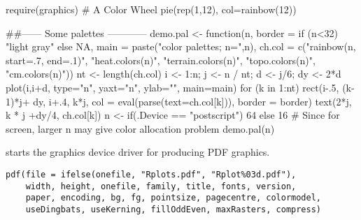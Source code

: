 \begin{Examples}
\begin{ExampleCode}
require(graphics)
# A Color Wheel
pie(rep(1,12), col=rainbow(12))

##------ Some palettes ------------
demo.pal <-
  function(n, border = if (n<32) "light gray" else NA,
           main = paste("color palettes;  n=",n),
           ch.col = c("rainbow(n, start=.7, end=.1)", "heat.colors(n)",
                      "terrain.colors(n)", "topo.colors(n)",
                      "cm.colors(n)"))
{
    nt <- length(ch.col)
    i <- 1:n; j <- n / nt; d <- j/6; dy <- 2*d
    plot(i,i+d, type="n", yaxt="n", ylab="", main=main)
    for (k in 1:nt) {
        rect(i-.5, (k-1)*j+ dy, i+.4, k*j,
             col = eval(parse(text=ch.col[k])), border = border)
        text(2*j,  k * j +dy/4, ch.col[k])
    }
}
n <- if(.Device == "postscript") 64 else 16
     # Since for screen, larger n may give color allocation problem
demo.pal(n)
\end{ExampleCode}
\end{Examples}
%
\begin{Description}\relax
{} starts the graphics device driver for producing PDF
graphics.
\end{Description}
%
\begin{Usage}
\begin{verbatim}
pdf(file = ifelse(onefile, "Rplots.pdf", "Rplot%03d.pdf"),
    width, height, onefile, family, title, fonts, version,
    paper, encoding, bg, fg, pointsize, pagecentre, colormodel,
    useDingbats, useKerning, fillOddEven, maxRasters, compress)
\end{verbatim}
\end{Usage}
%
